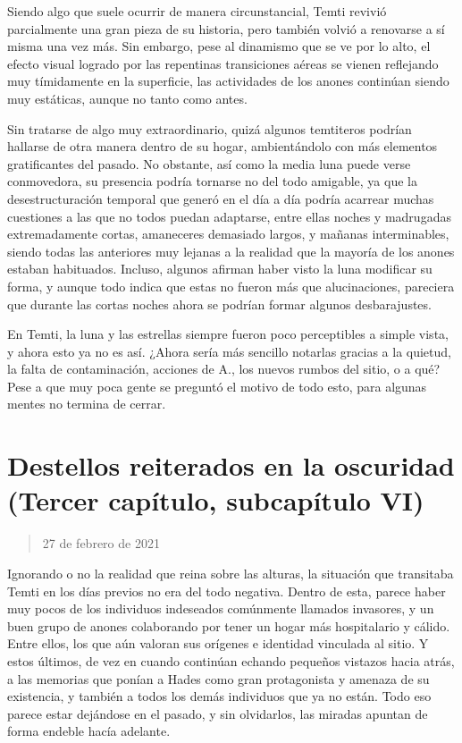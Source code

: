 \documentclass[
  spanish,
]{book}
\begin{document}
Siendo algo que suele ocurrir de manera circunstancial, Temti revivió parcialmente una gran pieza de su historia, pero también volvió a renovarse a sí misma una vez más. Sin embargo, pese al dinamismo que se ve por lo alto, el efecto visual logrado por las repentinas transiciones aéreas se vienen reflejando muy tímidamente en la superficie, las actividades de los anones continúan siendo muy estáticas, aunque no tanto como antes.

Sin tratarse de algo muy extraordinario, quizá algunos temtiteros podrían hallarse de otra manera dentro de su hogar, ambientándolo con más elementos gratificantes del pasado.
No obstante, así como la media luna puede verse conmovedora, su presencia podría tornarse no del todo amigable, ya que la desestructuración temporal que generó en el día a día podría acarrear muchas cuestiones a las que no todos puedan adaptarse, entre ellas noches y madrugadas extremadamente cortas, amaneceres demasiado largos, y mañanas interminables, siendo todas las anteriores muy lejanas a la realidad que la mayoría de los anones estaban habituados.
Incluso, algunos afirman haber visto la luna modificar su forma, y aunque todo indica que estas no fueron más que alucinaciones, pareciera que durante las cortas noches ahora se podrían formar algunos desbarajustes.

En Temti, la luna y las estrellas siempre fueron poco perceptibles a simple vista, y ahora esto ya no es así. ¿Ahora sería más sencillo notarlas gracias a la quietud, la falta de contaminación, acciones de A., los nuevos rumbos del sitio, o a qué?
Pese a que muy poca gente se preguntó el motivo de todo esto, para algunas mentes no termina de cerrar.

\hypertarget{destellos-reiterados-en-la-oscuridad-tercer-capuxedtulo-subcapuxedtulo-vi}{%
\section{Destellos reiterados en la oscuridad (Tercer capítulo, subcapítulo VI)}\label{destellos-reiterados-en-la-oscuridad-tercer-capuxedtulo-subcapuxedtulo-vi}}

\begin{quote}
27 de febrero de 2021
\end{quote}

Ignorando o no la realidad que reina sobre las alturas, la situación que transitaba Temti en los días previos no era del todo negativa.
Dentro de esta, parece haber muy pocos de los individuos indeseados comúnmente llamados invasores, y un buen grupo de anones colaborando por tener un hogar más hospitalario y cálido.
Entre ellos, los que aún valoran sus orígenes e identidad vinculada al sitio. Y estos últimos, de vez en cuando continúan echando pequeños vistazos hacia atrás, a las memorias que ponían a Hades como gran protagonista y amenaza de su existencia, y también a todos los demás individuos que ya no están. Todo eso parece estar dejándose en el pasado, y sin olvidarlos, las miradas apuntan de forma endeble hacía adelante.
\end{document}
